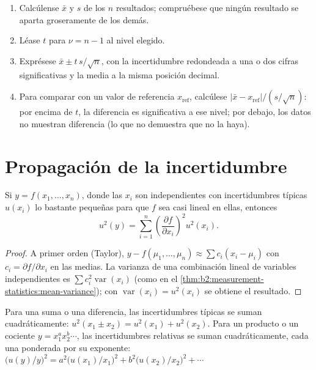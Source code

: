 \begin{method}\label{met:b2:measurement-statistics:confidence-interval}
\begin{enumerate}
  \item Calcúlense $\bar x$ y $s$ de los $n$ resultados; compruébese que ningún resultado se aparta groseramente de los demás.
  \item Léase $t$ para $\nu = n - 1$ al nivel elegido.
  \item Exprésese $\bar x \pm t\,s/\sqrt n$, con la incertidumbre redondeada a una o dos cifras significativas
        y la media a la misma posición decimal.
  \item Para comparar con un valor de referencia $x_{\mathrm{ref}}$, calcúlese $|\bar x - x_{\mathrm{ref}}|/(s/\sqrt
        n)$: por encima de $t$, la diferencia es significativa a ese nivel; por debajo, los datos no muestran
        diferencia (lo que no demuestra que no la haya).
\end{enumerate}
\end{method}

\section{Propagación de la incertidumbre}

\begin{theorem}\label{thm:b2:measurement-statistics:propagation}
Si $y = f(x_1, \dots, x_n)$, donde las $x_i$ son independientes con incertidumbres típicas $u(x_i)$ lo bastante pequeñas
para que $f$ sea casi lineal en ellas, entonces
\begin{equation*}
u^2(y) = \sum_{i=1}^{n}\left(\frac{\partial f}{\partial x_i}\right)^2 u^2(x_i).
\end{equation*}
\end{theorem}

\begin{proof}
A primer orden (Taylor), $y - f(\mu_1, \dots, \mu_n) \approx \sum c_i(x_i - \mu_i)$ con $c_i = \partial
f/\partial x_i$ en las medias. La varianza de una combinación lineal de variables independientes es
$\sum c_i^2\operatorname{var}(x_i)$ (como en el \cref{thm:b2:measurement-statistics:mean-variance}); con
$\operatorname{var}(x_i) = u^2(x_i)$ se obtiene el resultado.
\end{proof}

\begin{corollary}\label{cor:b2:measurement-statistics:products}
Para una suma o una diferencia, las incertidumbres típicas se suman cuadráticamente: $u^2(x_1 \pm x_2) = u^2(x_1) +
u^2(x_2)$. Para un producto o un cociente $y = x_1^{a}x_2^{b}\cdots$, las incertidumbres relativas se suman
cuadráticamente, cada una ponderada por su exponente: $\bigl(u(y)/y\bigr)^2 = a^2\bigl(u(x_1)/x_1\bigr)^2 +
b^2\bigl(u(x_2)/x_2\bigr)^2 + \cdots$
\end{corollary}

